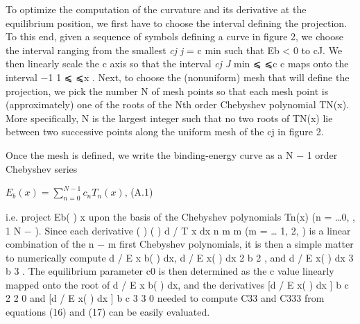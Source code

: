 \documentclass{article}
\begin{document}
To optimize the computation of the curvature and its derivative at the equilibrium position, we first have to choose the interval defining the projection. To this end, given a sequence of symbols defining a curve in figure 2, we choose the interval ranging from the smallest \textit{cj j} = c min such that Eb < 0 to cJ. We then linearly scale the c axis so that the interval \textit{cj J} min ⩽ ⩽c c maps onto the interval −1 1 ⩽ ⩽x . Next, to choose the (nonuniform) mesh that will define the projection, we pick the number N of mesh points so that each mesh point is (approximately) one of the roots of the Nth order Chebyshev polynomial TN(x). More specifically, N is the largest integer such that no two roots of TN(x) lie between two successive points along the uniform mesh of the cj in figure 2.

Once the mesh is defined, we write the binding-energy curve as a N − 1 order Chebyshev series

$E_{b}(x)=\sum_{n=0}^{N-1}c_{n}T_{n}(x)$, (A.1)

i.e. project Eb( ) x upon the basis of the Chebyshev polynomials Tn(x) (n = …0, , 1 N − ). Since each derivative ( ) ( ) d / T x dx n m m (m = … 1, 2, ) is a linear combination of the n − m first Chebyshev polynomials, it is then a simple matter to numerically compute d / E x b( ) dx, d / E x( ) dx 2 b 2 , and d / E x( ) dx 3 b 3 . The equilibrium parameter c0 is then determined as the c value linearly mapped onto the root of d / E x b( ) dx, and the derivatives [d / E x( ) dx ] b c 2 2 0 and [d / E x( ) dx ] b c 3 3 0 needed to compute C33 and C333 from equations (16) and (17) can be easily evaluated.
\end{document}
